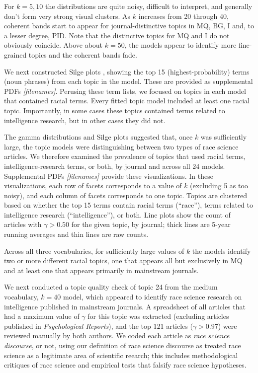 \documentclass[12pt]{article}
\begin{document}
For \(k=5, 10\) the distributions are quite noisy, difficult to interpret, and generally don't form very strong visual clusters. As \(k\) increases from 20 through 40, coherent bands start to appear for journal-distinctive topics in MQ, BG, I and, to a lesser degree, PID. Note that the distinctive topics for MQ and I do not obviously coincide. Above about \(k=50\), the models appear to identify more fine-grained topics and the coherent bands fade.

We next constructed Silge plots \cite{SilgeTopicModeling2017}, showing the top 15 (highest-probability) terms (noun phrases) from each topic in the model. These are provided as supplemental PDFs \emph{{[}filenames{]}}. Perusing these term lists, we focused on topics in each model that contained racial terms. Every fitted topic model included at least one racial topic. Importantly, in some cases these topics contained terms related to intelligence research, but in other cases they did not.

The gamma distributions and Silge plots suggested that, once \(k\) was sufficiently large, the topic models were distinguishing between two types of race science articles. We therefore examined the prevalence of topics that used racial terms, intelligence-research terms, or both, by journal and across all 24 models. Supplemental PDFs \emph{{[}filenames{]}} provide these visualizations. In these visualizations, each row of facets corresponds to a value of \(k\) (excluding 5 as too noisy), and each column of facets corresponds to one topic. Topics are clustered based on whether the top 15 terms contain racial terms (``race''), terms related to intelligence research (``intelligence''), or both. Line plots show the count of articles with \(\gamma > 0.50\) for the given topic, by journal; thick lines are 5-year running averages and thin lines are raw counts.

Across all three vocabularies, for sufficiently large values of \(k\) the models identify two or more different racial topics, one that appears all but exclusively in MQ and at least one that appears primarily in mainstream journals.

We next conducted a topic quality check of topic 24 from the medium vocabulary, \(k=40\) model, which appeared to identify race science research on intelligence published in mainstream journals. A spreadsheet of all articles that had a maximum value of \(\gamma\) for this topic was extracted (excluding articles published in \emph{Psychological Reports}), and the top 121 articles (\(\gamma > 0.97\)) were reviewed manually by both authors. We coded each article as \emph{race science discourse}, or not, using our definition of race science discourse as treated race science as a legitimate area of scientific reearch; this includes methodological critiques of race science and empirical tests that falsify race science hypotheses.
\end{document}
